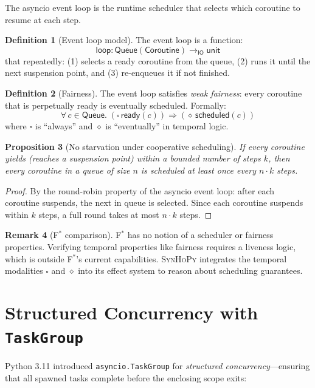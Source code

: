 \documentclass[11pt,a4paper]{report}
\theoremstyle{definition}
\newtheorem{definition}{Definition}[chapter]
\newtheorem{remark}[definition]{Remark}
\theoremstyle{plain}
\newtheorem{proposition}[definition]{Proposition}
\newcommand{\IO}{\mathsf{IO}}
\newcommand{\fstar}{F$^{*}$}
\newcommand{\synhopy}{\textsc{SynHoPy}}
\begin{document}
The asyncio event loop is the runtime scheduler that selects which
coroutine to resume at each step.

\begin{definition}[Event loop model]
The event loop is a function:
\[
  \mathsf{loop} : \mathsf{Queue}(\mathsf{Coroutine}) \to_\IO \mathsf{unit}
\]
that repeatedly: (1) selects a ready coroutine from the queue,
(2) runs it until the next suspension point, and (3) re-enqueues it
if not finished.
\end{definition}

\begin{definition}[Fairness]
The event loop satisfies \emph{weak fairness}: every coroutine that is
perpetually ready is eventually scheduled.  Formally:
\[
  \forall\, c \in \mathsf{Queue}.\;
    \left(\square\, \mathsf{ready}(c)\right) \Rightarrow
    \left(\diamond\, \mathsf{scheduled}(c)\right)
\]
where $\square$ is ``always'' and $\diamond$ is ``eventually'' in temporal
logic.
\end{definition}

\begin{proposition}[No starvation under cooperative scheduling]
If every coroutine yields (reaches a suspension point) within a bounded
number of steps $k$, then every coroutine in a queue of size $n$ is
scheduled at least once every $n \cdot k$ steps.
\end{proposition}
\begin{proof}
By the round-robin property of the asyncio event loop: after each
coroutine suspends, the next in queue is selected.  Since each coroutine
suspends within $k$ steps, a full round takes at most $n \cdot k$ steps.
\end{proof}

\begin{remark}[\fstar{} comparison]
\fstar{} has no notion of a scheduler or fairness properties.  Verifying
temporal properties like fairness requires a liveness logic, which is
outside \fstar{}'s current capabilities.  \synhopy{} integrates the
temporal modalities $\square$ and $\diamond$ into its effect system to
reason about scheduling guarantees.
\end{remark}

\section{Structured Concurrency with \texttt{TaskGroup}}

Python 3.11 introduced \lstinline[style=python]{asyncio.TaskGroup} for
\emph{structured concurrency}---ensuring that all spawned tasks complete
before the enclosing scope exits:
\end{document}
